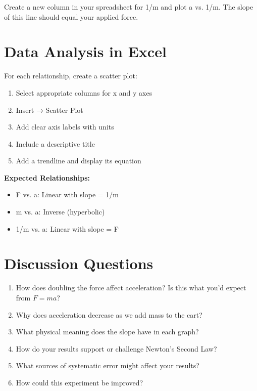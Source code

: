 \documentclass[12pt]{article}
\begin{document}
Create a new column in your spreadsheet for 1/m and plot a vs. 1/m. The slope of this line should equal your applied force.

\section*{Data Analysis in Excel}

\begin{tcolorbox}[colback=labblue!5,colframe=labblue,title=\textbf{Creating Effective Scientific Graphs}]
For each relationship, create a scatter plot:
\begin{enumerate}[label=\arabic*.]
\item Select appropriate columns for x and y axes
\item Insert → Scatter Plot
\item Add clear axis labels with units
\item Include a descriptive title
\item Add a trendline and display its equation
\end{enumerate}

\textbf{Expected Relationships:}
\begin{itemize}
\item F vs. a: Linear with slope = 1/m
\item m vs. a: Inverse (hyperbolic)
\item 1/m vs. a: Linear with slope = F
\end{itemize}
\end{tcolorbox}


\section*{Discussion Questions}
\begin{enumerate}[label=\arabic*.]
\item How does doubling the force affect acceleration? Is this what you'd expect from $F = ma$?
\item Why does acceleration decrease as we add mass to the cart?
\item What physical meaning does the slope have in each graph?
\item How do your results support or challenge Newton's Second Law?
\item What sources of systematic error might affect your results?
\item How could this experiment be improved?
\end{enumerate}
\end{document}

